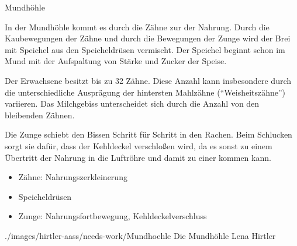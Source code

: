 \TextSlidePicture
{Mundhöhle}%
{%
In der Mundhöhle kommt es durch die Zähne zur
 der Nahrung. Durch die Kaubewegungen der
Zähne und durch die Bewegungen der Zunge wird der Brei mit
Speichel aus den Speicheldrüsen vermischt.
 Der Speichel beginnt schon im
Mund mit der Aufspaltung von Stärke und Zucker der Speise.

Der Erwachsene besitzt bis zu 32 Zähne.
 Diese Anzahl kann insbesondere
durch die unterschiedliche Ausprägung der hintersten
Mahlzähne (\protect\enquote{Weisheitszähne}) variieren. Das
Milchgebiss unterscheidet sich durch die Anzahl
 von den bleibenden Zähnen.

Die Zunge schiebt den Bissen Schritt für Schritt in den
Rachen. Beim Schlucken sorgt sie dafür, dass der Kehldeckel
verschloßen wird, da es sonst zu einem Übertritt der Nahrung
in die Luftröhre und damit zu einer  kommen
kann.}%
{
\begin{itemize}
    \item Zähne: Nahrungszerkleinerung
    \item Speicheldrüsen
    \item Zunge: Nahrungsfortbewegung, Kehldeckelverschluss
\end{itemize}}%
{./images/hirtler-aass/needs-work/Mundhoehle}%
{Die Mundhöhle}%
{}%
{Lena Hirtler}%
{}%

